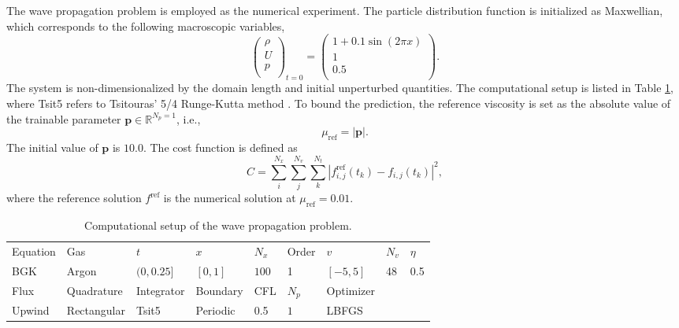 \documentclass[preprint,3p,12pt,sort&compress]{elsarticle}
\begin{document}
The wave propagation problem is employed as the numerical experiment.
The particle distribution function is initialized as Maxwellian, which corresponds to the following macroscopic variables,
\begin{equation}
\left(\begin{array}{c}
\rho \\
U \\
p \\
\end{array}\right)_{{t=0}}=\left(\begin{array}{c}
1+0.1\sin (2\pi x) \\
1 \\
0.5 \\
\end{array}\right).
\end{equation}
The system is non-dimensionalized by the domain length and initial unperturbed quantities.
The computational setup is listed in Table \ref{tab:wave}, where Tsit5 refers to Tsitouras’ 5/4 Runge-Kutta method \cite{tsitouras2011modified}.
To bound the prediction, the reference viscosity is set as the absolute value of the trainable parameter $\mathbf p \in\mathbb R^{N_p=1}$, i.e.,
\begin{equation}
    \mu_\mathrm{ref}=| \mathbf p |.
\end{equation}
The initial value of $\mathbf p$ is $10.0$.
The cost function is defined as
\begin{equation}
    C = \sum_i^{N_x}\sum_j^{N_v}\sum_k^{N_t} |f_{i,j}^{\mathrm{ref}}(t_k)-f_{i,j}(t_k)|^2,
\end{equation}
where the reference solution $f^\mathrm{ref}$ is the numerical solution at $\mu_\mathrm{ref}=0.01$.

\begin{table}[htbp]
    \caption{Computational setup of the wave propagation problem.} 
    \centering
    \begin{tabular}{lllllllll} 
        \hline
        Equation & Gas & $t$ & $x$ & $N_{x}$ & Order & $v$ & $N_{v}$ & $\eta$ \\ 
        BGK & Argon & $(0,0.25]$ & $[0,1]$ & $100$ & 1 & $[-5,5]$ & 48 & 0.5 \\ 
        \hline
        Flux & Quadrature & Integrator & Boundary & CFL & $N_{p}$ & Optimizer \\
        Upwind & Rectangular & Tsit5 & Periodic & 0.5 & $1$ & LBFGS \\
        \hline
    \end{tabular} 
    \label{tab:wave}
\end{table}
\end{document}
